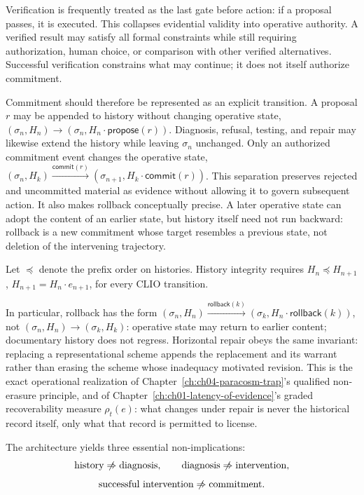 Verification is frequently treated as the last gate before action: if a proposal passes, it is executed. This collapses evidential validity into operative authority. A verified result may satisfy all formal constraints while still requiring authorization, human choice, or comparison with other verified alternatives. Successful verification constrains what may continue; it does not itself authorize commitment.

Commitment should therefore be represented as an explicit transition. A proposal $r$ may be appended to history without changing operative state, $(\sigma_n, H_n) \to (\sigma_n, H_n \cdot \mathsf{propose}(r))$. Diagnosis, refusal, testing, and repair may likewise extend the history while leaving $\sigma_n$ unchanged. Only an authorized commitment event changes the operative state, $(\sigma_n, H_k) \xrightarrow{\mathsf{commit}(r)} (\sigma_{n+1}, H_k \cdot \mathsf{commit}(r))$. This separation preserves rejected and uncommitted material as evidence without allowing it to govern subsequent action. It also makes rollback conceptually precise. A later operative state can adopt the content of an earlier state, but history itself need not run backward: rollback is a new commitment whose target resembles a previous state, not deletion of the intervening trajectory.

\begin{definition}
Let $\preceq$ denote the prefix order on histories. History integrity requires $H_n \preceq H_{n+1}$, $H_{n+1} = H_n \cdot e_{n+1}$, for every CLIO transition.
\end{definition}

In particular, rollback has the form $(\sigma_n, H_n) \xrightarrow{\mathsf{rollback}(k)} (\sigma_k, H_n \cdot \mathsf{rollback}(k))$, not $(\sigma_n,H_n) \to (\sigma_k,H_k)$: operative state may return to earlier content; documentary history does not regress. Horizontal repair obeys the same invariant: replacing a representational scheme appends the replacement and its warrant rather than erasing the scheme whose inadequacy motivated revision. This is the exact operational realization of Chapter~\ref{ch:ch04-paracosm-trap}'s qualified non-erasure principle, and of Chapter~\ref{ch:ch01-latency-of-evidence}'s graded recoverability measure $\rho_t(e)$: what changes under repair is never the historical record itself, only what that record is permitted to license.

The architecture yields three essential non-implications:
\[
\text{history} \centernot\Rightarrow \text{diagnosis}, \qquad \text{diagnosis} \centernot\Rightarrow \text{intervention},
\]
\[
\text{successful intervention} \centernot\Rightarrow \text{commitment}.
\]

